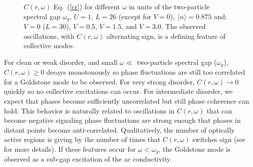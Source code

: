 \documentclass[Collective.tex]{revtex4-1}
\begin{document}
\begin{figure}[t]
		\caption{$C(r,\omega)$ Eq.~(\ref{cr}) for different $\omega$ in units of the two-particle spectral gap $\omega_g$, $U=1$, $L=26$ (except for $V = 0$), $\langle n \rangle = 0.875$ and:  $V=0$ ($L=30$),  $V=0.5$,  $V=1.5$, and  $V=3.0$. The observed oscillations, with $C(r,\omega)$ alternating sign, is a defining feature of collective modes. 
		} \label{Fig.pha_corU1}
\end{figure}
For clean or weak disorder, and small $\omega \ll$ two-particle spectral gap ($\omega_g$),
$C(r,\omega) \ge 0$ decays monotonously so phase fluctuations are still too correlated for a Goldstone mode to be observed. For very strong disorder, $C(r,\omega) \to 0$ quickly so no collective excitations can occur. For intermediate disorder, we expect that phases become sufficiently uncorrelated but still phase coherence can hold. This behavior is naturally related to oscillations in $C(r,\omega)$ that can become negative signaling phase fluctuations are strong enough that phases in distant points become anti-correlated. Qualitatively, the number of optically active regions is giving by the number of times that $C(r,\omega)$ switches sign (see \cite{Supplementary} for more details). If these features occur for $\omega <\omega_g$, the Goldstone mode is observed as a sub-gap excitation of the ac conductivity. 
\end{document}
